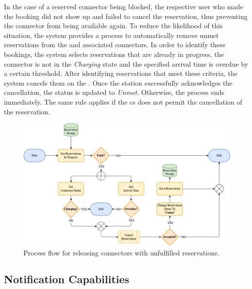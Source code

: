 In the case of a reserved connector being blocked, the respective user who made the booking did not show up and failed to cancel the reservation, thus preventing the connector from being available again.
To reduce the likelihood of this situation, the system provides a process to automatically remove unmet reservations from the  and associated connectors.
In order to identify these bookings, the system selects reservations that are already in progress, the connector is not in the \textit{Charging} state and the specified arrival time is overdue by a certain threshold.
After identifying reservations that meet these criteria, the system cancels them on the . Once the station successfully acknowledges the cancellation, the status is updated to \textit{Unmet}.
Otherwise, the process ends immediately. The same rule applies if the \acrshort{cs} does not permit the cancellation of the reservation.

\begin{figure}[h]
    \centering
    \includegraphics[scale=0.4]{resources/images/main/5_design/processes/scheduler/CancelUnmetReservation.png}
    \caption{Process flow for releasing connectors with unfulfilled reservations.}
    \label{fig:free-connector-flowchart}
\end{figure}

\newpage

\subsection{Notification Capabilities}
\label{ch:Design:sec:Reservation System:ssec:Notification Capabilities}

